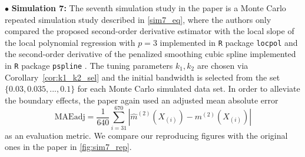 \documentclass{uwstat572}
\theoremstyle{definition}
\renewcommand{\hat}{\widehat}
\theoremstyle{theorem}
\begin{document}
$\bullet$ {\bf Simulation 7:} The seventh simulation study in the paper \citep{liu2020smoothed} is a Monte Carlo repeated simulation study described in \eqref{sim7_eq}, where the authors only compared the proposed second-order derivative estimator with the local slope of the local polynomial regression with $p=3$ implemented in \texttt{R} package \texttt{locpol} \citep{locpol2022R} and the second-order derivative of the penalized smoothing cubic spline implemented in \texttt{R} package \texttt{pspline} \citep{pspline2022R}. The tuning parameters $k_1,k_2$ are chosen via Corollary~\ref{cor:k1_k2_sel} and the initial bandwidth is selected from the set $\{0.03, 0.035,...,0.1\}$ for each Monte Carlo simulated data set. In order to alleviate the boundary effects, the paper again used an adjusted mean absolute error 
$$\text{MAEadj}=\frac{1}{640}\sum_{i=31}^{670} \left|\hat{m}^{(2)}(X_{(i)}) -m^{(2)}(X_{(i)}) \right|$$
as an evaluation metric. We compare our reproducing figures with the original ones in the paper in \autoref{fig:sim7_rep}.
\end{document}

